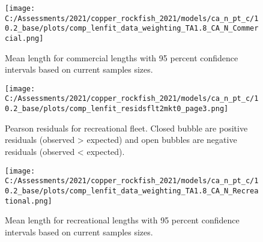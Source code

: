 \documentclass[11pt,
  english,
  a4paper,
]{article}
\begin{document}
\tagmcend\tagstructend


\begin{figure}
\centering
\texttt{[image: C:/Assessments/2021/copper\_rockfish\_2021/models/ca\_n\_pt\_c/10.2\_base/plots/comp\_lenfit\_data\_weighting\_TA1.8\_CA\_N\_Commercial.png]}
\caption{Mean length for commercial lengths with 95 percent confidence intervals based on current samples sizes.\label{fig:com-mean-len-fit}}
\end{figure}

\tagmcend\tagstructend


\begin{figure}
\centering
\texttt{[image: C:/Assessments/2021/copper\_rockfish\_2021/models/ca\_n\_pt\_c/10.2\_base/plots/comp\_lenfit\_residsflt2mkt0\_page3.png]}
\caption{Pearson residuals for recreational fleet. Closed bubble are positive residuals (observed \textgreater{} expected) and open bubbles are negative residuals (observed \textless{} expected).\label{fig:rec-pearson}}
\end{figure}

\tagmcend\tagstructend


\begin{figure}
\centering
\texttt{[image: C:/Assessments/2021/copper\_rockfish\_2021/models/ca\_n\_pt\_c/10.2\_base/plots/comp\_lenfit\_data\_weighting\_TA1.8\_CA\_N\_Recreational.png]}
\caption{Mean length for recreational lengths with 95 percent confidence intervals based on current samples sizes.\label{fig:rec-mean-len-fit}}
\end{figure}

\tagmcend\tagstructend

\end{document}
